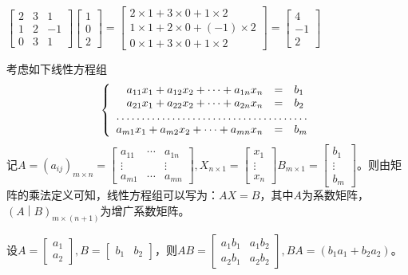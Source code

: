 \begin{solution}
$\begin{bmatrix} 2 & 3 & 1 \\ 1 & 2 & -1 \\ 0 & 3 & 1\end{bmatrix} \begin{bmatrix} 1 \\ 0 \\ 2 \end{bmatrix} = \begin{bmatrix} 2\times 1 + 3\times 0 + 1\times 2 \\ 1\times 1 + 2\times 0 + (-1)\times 2 \\ 0\times 1 + 3\times 0 + 1\times 2\end{bmatrix} = \begin{bmatrix} 4 \\ -1 \\ 2 \end{bmatrix}$
\end{solution}

\begin{eg}
考虑如下线性方程组
$$\left\{ \begin{array}{rcl} a_{11}x_1 + a_{12}x_2 + \cdots + a_{1n}x_n & = & b_1 \\ a_{21}x_1 + a_{22}x_2 + \cdots + a_{2n}x_n & = & b_2 \\ \hdotsfor{3} \\ a_{m1}x_1 + a_{m2}x_2 + \cdots + a_{mn}x_n & = & b_m \end{array}\right.$$
记$A = (a_{ij})_{m\times n} = \begin{bmatrix} a_{11} & \cdots & a_{1n} \\ \vdots & & \vdots \\ a_{m1} & \cdots & a_{mn} \end{bmatrix}, X_{n\times 1} = \begin{bmatrix} x_1 \\ \vdots \\ x_n \end{bmatrix} B_{m\times 1} = \begin{bmatrix} b_1 \\ \vdots \\ b_m \end{bmatrix}$。则由矩阵的乘法定义可知，线性方程组可以写为：$AX = B$，其中$A$为系数矩阵，$\left( A \middle| B \right)_{m\times(n+1)}$为增广系数矩阵。
\end{eg}

\begin{eg}
设$A = \begin{bmatrix} a_1 \\ a_2 \end{bmatrix}, B = \begin{bmatrix} b_1 & b_2 \end{bmatrix}$，则$AB = \begin{bmatrix} a_1b_1 & a_1b_2 \\ a_2b_1 & a_2b_2 \end{bmatrix}, BA = (b_1a_1 + b_2a_2)$。
\end{eg}

